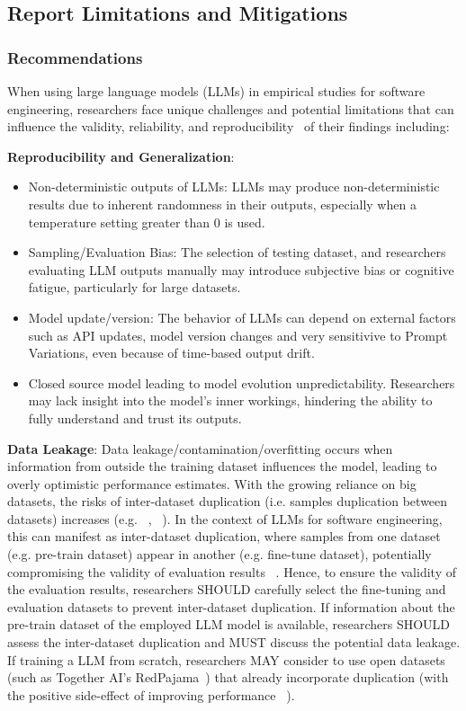 



\subsection{Report Limitations and Mitigations}

\subsubsection{Recommendations}
When using large language models (LLMs) in empirical studies for software engineering, researchers face unique challenges and potential limitations that can influence the validity, reliability, and reproducibility~\cite{sallou2024breaking} of their findings including:

\textbf{Reproducibility and Generalization}:
\begin{itemize}
  \item Non-deterministic outputs of LLMs: LLMs may produce non-deterministic results due to inherent randomness in their outputs, especially when a temperature setting greater than 0 is used.
  \item Sampling/Evaluation Bias: The selection of testing dataset, and researchers evaluating LLM outputs manually may introduce subjective bias or cognitive fatigue, particularly for large datasets.
  \item Model update/version:  The behavior of LLMs can depend on external factors such as API updates, model version changes and very sensitivive to Prompt Variations, even because of time-based output drift.
  \item Closed source model leading to model evolution unpredictability. Researchers may lack insight into the model's inner workings, hindering the ability to fully understand and trust its outputs.
\end{itemize}

\textbf{Data Leakage}:
Data leakage/contamination/overfitting occurs when information from outside the training dataset influences the model, leading to overly optimistic performance estimates. With the growing reliance on big datasets, the risks of inter-dataset duplication (i.e. samples duplication between datasets) increases (e.g. ~\cite{10.1145/3133908}, ~\cite{10.1145/3359591.3359735}). 
In the context of LLMs for software engineering, this can manifest as inter-dataset duplication, where samples from one dataset (e.g. pre-train dataset) appear in another (e.g. fine-tune dataset), potentially compromising the validity of evaluation results ~\cite{inter-dataset-lopez2025}. 
Hence, to ensure the validity of the evaluation results, researchers SHOULD carefully select the fine-tuning and evaluation datasets to prevent inter-dataset duplication. If information about the pre-train dataset of the employed LLM model is available, researchers SHOULD assess the inter-dataset duplication and MUST discuss the potential data leakage.
If training a LLM from scratch, researchers MAY consider to use open datasets (such as Together AI's RedPajama~\cite{together2023redpajama}) that already incorporate duplication (with the positive side-effect of improving performance ~\cite{lee-etal-2022-deduplicating}).

